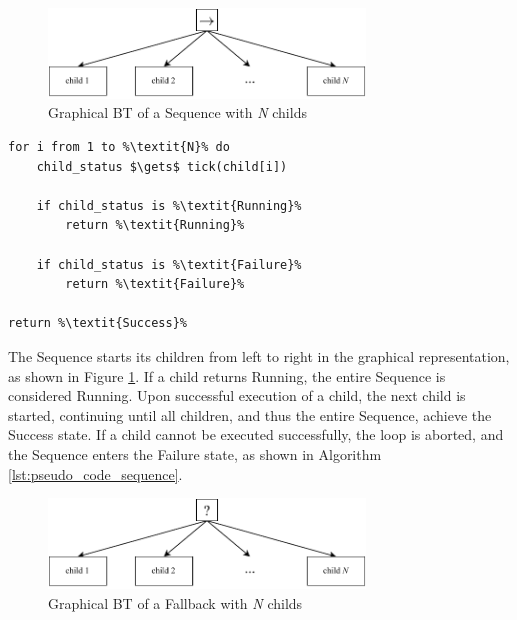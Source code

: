 \begin{figure}[h]
    \centering
    \includegraphics[width=0.75\textwidth]{figures/20_state_of_the_art/sequence.pdf}
    \caption{Graphical BT of a Sequence with \textit{N} childs}
    \label{fig:sequence}
\end{figure}

\begin{lstlisting}[float=h]
for i from 1 to %\textit{N}% do
    child_status $\gets$ tick(child[i])
    
    if child_status is %\textit{Running}%
        return %\textit{Running}%
        
    if child_status is %\textit{Failure}%
        return %\textit{Failure}%

return %\textit{Success}%
\end{lstlisting}

The Sequence starts its children from left to right in the graphical representation, as shown in Figure \ref{fig:sequence}. If a child returns Running, the entire Sequence is considered Running. Upon successful execution of a child, the next child is started, continuing until all children, and thus the entire Sequence, achieve the Success state. If a child cannot be executed successfully, the loop is aborted, and the Sequence enters the Failure state, as shown in Algorithm \ref{lst:pseudo_code_sequence}.
  

\begin{figure}[h]
    \centering
    \includegraphics[width=0.75\textwidth]{figures/20_state_of_the_art/fallback.pdf}
    \caption{Graphical BT of a Fallback with \textit{N} childs}
    \label{fig:fallback}
  \end{figure}
  
